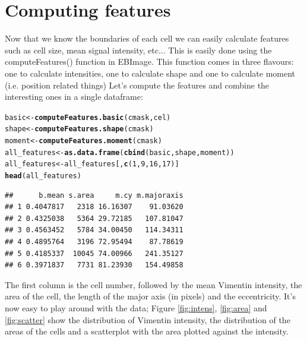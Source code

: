 \documentclass{article}\usepackage[]{graphicx}\usepackage[]{color}
\makeatletter
\newcommand{\hlnum}[1]{\textcolor[rgb]{0.686,0.059,0.569}{#1}}%
\newcommand{\hlstd}[1]{\textcolor[rgb]{0.345,0.345,0.345}{#1}}%
\newcommand{\hlkwb}[1]{\textcolor[rgb]{0.69,0.353,0.396}{#1}}%
\newcommand{\hlkwd}[1]{\textcolor[rgb]{0.737,0.353,0.396}{\textbf{#1}}}%
\newenvironment{kframe}{%
 \def\at@end@of@kframe{}%
 \ifinner\ifhmode%
  \def\at@end@of@kframe{\end{minipage}}%
  \begin{minipage}{\columnwidth}%
 \fi\fi%
 \def\FrameCommand##1{\hskip\@totalleftmargin \hskip-\fboxsep
 \colorbox{shadecolor}{##1}\hskip-\fboxsep
     \hskip-\linewidth \hskip-\@totalleftmargin \hskip\columnwidth}%
 \MakeFramed {\advance\hsize-\width
   \@totalleftmargin\z@ \linewidth\hsize
   \@setminipage}}%
 {\par\unskip\endMakeFramed%
 \at@end@of@kframe}
\newenvironment{knitrout}{}{} %
\makeatother
\begin{document}
\section{Computing features}
Now that we know the boundaries of each cell we can easily calculate features such as cell size, mean signal intensity, etc...
This is easily done using the computeFeatures() function in EBImage. This function comes in three flavours: one to calculate intensities, one to calculate shape and one to calculate moment (i.e. position related things)
Let's compute the features and combine the interesting ones in a single dataframe:
\begin{knitrout}
\color{fgcolor}\begin{kframe}
\begin{alltt}
\hlstd{basic} \hlkwb{<-} \hlkwd{computeFeatures.basic}\hlstd{(cmask, cel)}
\hlstd{shape} \hlkwb{<-} \hlkwd{computeFeatures.shape}\hlstd{(cmask)}
\hlstd{moment} \hlkwb{<-} \hlkwd{computeFeatures.moment}\hlstd{(cmask)}
\hlstd{all_features} \hlkwb{<-} \hlkwd{as.data.frame}\hlstd{(}\hlkwd{cbind}\hlstd{(basic, shape, moment))}
\hlstd{all_features} \hlkwb{<-} \hlstd{all_features[,}\hlkwd{c}\hlstd{(}\hlnum{1}\hlstd{,}\hlnum{9}\hlstd{,}\hlnum{16}\hlstd{,}\hlnum{17}\hlstd{)]}
\hlkwd{head}\hlstd{(all_features)}
\end{alltt}
\begin{verbatim}
##      b.mean s.area     m.cy m.majoraxis
## 1 0.4047817   2318 16.16307    91.03620
## 2 0.4325038   5364 29.72185   107.81047
## 3 0.4563452   5784 34.00450   114.34311
## 4 0.4895764   3196 72.95494    87.78619
## 5 0.4185337  10045 74.00966   241.35127
## 6 0.3971837   7731 81.23930   154.49858
\end{verbatim}
\end{kframe}
\end{knitrout}
The first column is the cell number, followed by the mean Vimentin intensity, the area of the cell, the length of the major axis (in pixels) and the eccentricity.
It's now easy to play around with the data; Figure \ref{fig:intens}, \ref{fig:area} and \ref{fig:scatter} show the distribution of Vimentin intensity, the distribution of the areas of the cells and a scatterplot with the area plotted against the intensity.
\end{document}

